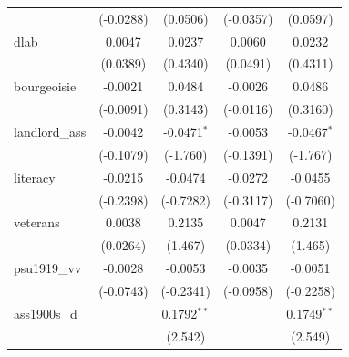\begin{table}[htbp]
\begin{tabular}{lcccc}
                                       & (-0.0288)             & (0.0506)                      & (-0.0357)            & (0.0597)\\   
      dlab                             & 0.0047                & 0.0237                        & 0.0060               & 0.0232\\   
                                       & (0.0389)              & (0.4340)                      & (0.0491)             & (0.4311)\\   
      bourgeoisie                      & -0.0021               & 0.0484                        & -0.0026              & 0.0486\\   
                                       & (-0.0091)             & (0.3143)                      & (-0.0116)            & (0.3160)\\   
      landlord\_ass                    & -0.0042               & -0.0471$^{*}$                 & -0.0053              & -0.0467$^{*}$\\   
                                       & (-0.1079)             & (-1.760)                      & (-0.1391)            & (-1.767)\\   
      literacy                         & -0.0215               & -0.0474                       & -0.0272              & -0.0455\\   
                                       & (-0.2398)             & (-0.7282)                     & (-0.3117)            & (-0.7060)\\   
      veterans                         & 0.0038                & 0.2135                        & 0.0047               & 0.2131\\   
                                       & (0.0264)              & (1.467)                       & (0.0334)             & (1.465)\\   
      psu1919\_vv                      & -0.0028               & -0.0053                       & -0.0035              & -0.0051\\   
                                       & (-0.0743)             & (-0.2341)                     & (-0.0958)            & (-0.2258)\\   
      ass1900s\_d                      &                       & 0.1792$^{**}$                 &                      & 0.1749$^{**}$\\   
                                       &                       & (2.542)                       &                      & (2.549)\\   

\end{tabular}
\end{table}
